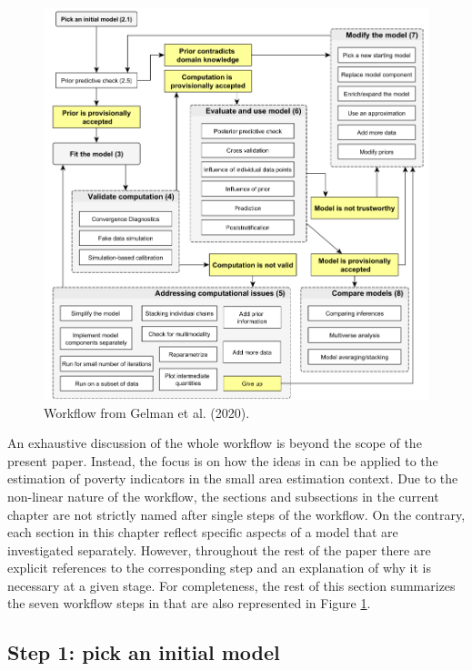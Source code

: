 \begin{figure}
    \includegraphics[width=16cm]{./graphics/workflow}
    \caption{Workflow from Gelman et al. (2020).}
    \label{fig:gelman_wf}
\end{figure}


An exhaustive discussion of the whole workflow is beyond the scope of the present paper.
Instead, the focus is on how the ideas in \cite{gelman_bayesian_2020} can be applied to the estimation of poverty indicators in the small area estimation context.
Due to the non-linear nature of the workflow, the sections and subsections in the current chapter are not strictly named after single steps of the workflow.
On the contrary, each section in this chapter reflect specific aspects of a model that are investigated separately.
However, throughout the rest of the paper there are explicit references to the corresponding step and an explanation of why it is necessary at a given stage.
For completeness, the rest of this section summarizes the seven workflow steps in \cite{gelman_bayesian_2020} that are also represented in Figure \ref{fig:gelman_wf}.

\subsection{Step 1: pick an initial model}

